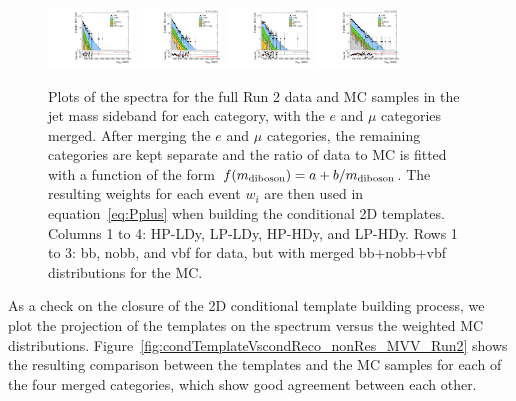 \begin{figure}[htbp]
  \includegraphics[width=0.2\textwidth]{fig/2Dfit/slopesSB_b1_allL_HP_vbf_LDy_Run2_mWV_1OverX.pdf}
  \includegraphics[width=0.2\textwidth]{fig/2Dfit/slopesSB_b1_allL_LP_vbf_LDy_Run2_mWV_1OverX.pdf}
  \includegraphics[width=0.2\textwidth]{fig/2Dfit/slopesSB_b1_allL_HP_vbf_HDy_Run2_mWV_1OverX.pdf}
  \includegraphics[width=0.2\textwidth]{fig/2Dfit/slopesSB_b1_allL_LP_vbf_HDy_Run2_mWV_1OverX.pdf}\\
  \caption{
    Plots of the \MVV spectra for the full Run 2 data and MC samples in the jet mass sideband for each category, with the $e$ and $\mu$ categories merged.
    After merging the $e$ and $\mu$ categories, the remaining categories are kept separate and the ratio of data to MC is fitted with a function of the form $f(m_\mathrm{diboson})=a+b/m_\mathrm{diboson}$.
    The resulting weights for each event $w_i$ are then used in equation~\ref{eq:Pplus} when building the conditional 2D templates.
    Columns 1 to 4: HP-LDy, LP-LDy, HP-HDy, and LP-HDy.
    Rows 1 to 3: bb, nobb, and vbf for data, but with merged bb+nobb+vbf distributions for the MC.
  }
  \label{fig:nonResMvvSpectrumReweighting}
\end{figure}

As a check on the closure of the 2D conditional template building process, we plot the projection of the templates on the \MVV spectrum versus the weighted MC distributions.
Figure~\ref{fig:condTemplateVscondReco_nonRes_MVV_Run2} shows the resulting comparison between the templates and the MC samples for each of the four merged categories, which show good agreement between each other.

